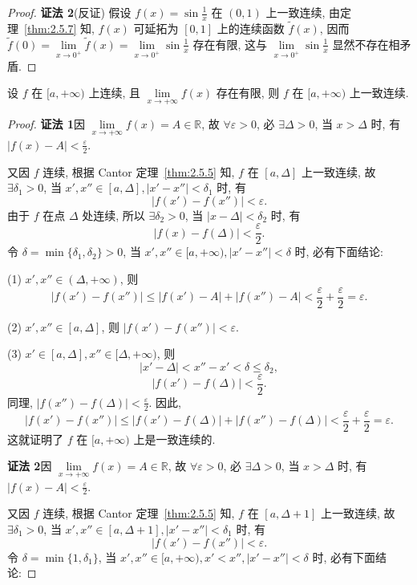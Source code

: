 \begin{proof}
\textbf{证法 2}\quad (反证) 假设 $f(x) = \sin\frac{1}{x}$ 在 $(0,1)$ 上一致连续, 由定理~\ref{thm:2.5.7} 知, $f(x)$ 可延拓为 $[0,1]$ 上的连续函数 $\tilde{f}(x)$, 因而 $\tilde{f}(0) = \lim\limits_{x \to 0^+} \tilde{f}(x) = \lim\limits_{x \to 0^+} \sin\frac{1}{x}$ 存在有限, 这与 $\lim\limits_{x \to 0^+} \sin\frac{1}{x}$ 显然不存在相矛盾.
\end{proof}

\begin{example}\label{ex:2.5.10}
设 $f$ 在 $[a,+\infty)$ 上连续, 且 $\lim\limits_{x \to +\infty} f(x)$ 存在有限, 则 $f$ 在 $[a,+\infty)$ 上一致连续.
\end{example}

\begin{proof}
\textbf{证法 1}\quad 因 $\lim\limits_{x \to +\infty} f(x) = A \in \mathbb{R}$, 故 $\forall \varepsilon > 0$, 必 $\exists \Delta > 0$, 当 $x > \Delta$ 时, 有 $|f(x) - A| < \frac{\varepsilon}{2}$.

又因 $f$ 连续, 根据 Cantor 定理~\ref{thm:2.5.5} 知, $f$ 在 $[a,\Delta]$ 上一致连续, 故 $\exists \delta_1 > 0$, 当 $x', x'' \in [a,\Delta], |x' - x''| < \delta_1$ 时, 有
\[
|f(x') - f(x'')| < \varepsilon.
\]
由于 $f$ 在点 $\Delta$ 处连续, 所以 $\exists \delta_2 > 0$, 当 $|x - \Delta| < \delta_2$ 时, 有
\[
|f(x) - f(\Delta)| < \frac{\varepsilon}{2}.
\]
令 $\delta = \min\{\delta_1, \delta_2\} > 0$, 当 $x', x'' \in [a,+\infty), |x' - x''| < \delta$ 时, 必有下面结论:

(1) $x', x'' \in (\Delta, +\infty)$, 则
\[
|f(x') - f(x'')| \leqslant |f(x') - A| + |f(x'') - A| < \frac{\varepsilon}{2} + \frac{\varepsilon}{2} = \varepsilon.
\]

(2) $x', x'' \in [a,\Delta]$, 则 $|f(x') - f(x'')| < \varepsilon$.

(3) $x' \in [a,\Delta], x'' \in [\Delta,+\infty)$, 则
\[
|x' - \Delta| < x'' - x' < \delta \leqslant \delta_2,
\]
\[
|f(x') - f(\Delta)| < \frac{\varepsilon}{2}.
\]
同理, $|f(x'') - f(\Delta)| < \frac{\varepsilon}{2}$. 因此,
\[
|f(x') - f(x'')| \leqslant |f(x') - f(\Delta)| + |f(x'') - f(\Delta)| < \frac{\varepsilon}{2} + \frac{\varepsilon}{2} = \varepsilon.
\]
这就证明了 $f$ 在 $[a,+\infty)$ 上是一致连续的.

\textbf{证法 2}\quad 因 $\lim\limits_{x \to +\infty} f(x) = A \in \mathbb{R}$, 故 $\forall \varepsilon > 0$, 必 $\exists \Delta > 0$, 当 $x > \Delta$ 时, 有 $|f(x) - A| < \frac{\varepsilon}{2}$.

又因 $f$ 连续, 根据 Cantor 定理~\ref{thm:2.5.5} 知, $f$ 在 $[a,\Delta+1]$ 上一致连续, 故 $\exists \delta_1 > 0$, 当 $x', x'' \in [a,\Delta+1], |x' - x''| < \delta_1$ 时, 有
\[
|f(x') - f(x'')| < \varepsilon.
\]
令 $\delta = \min\{1, \delta_1\}$, 当 $x', x'' \in [a,+\infty), x' < x'', |x' - x''| < \delta$ 时, 必有下面结论:


\end{proof}
